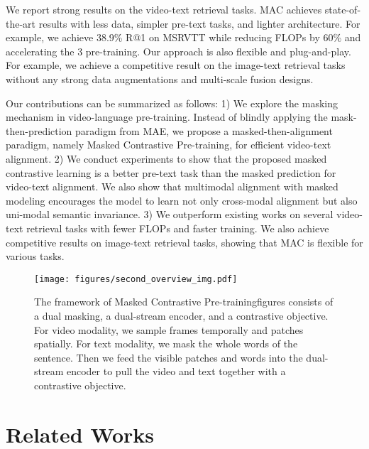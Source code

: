 \documentclass[10pt,twocolumn,letterpaper]{article}
\begin{document}
We report strong results on the video-text retrieval tasks. MAC achieves state-of-the-art results with less data, simpler pre-text tasks, and lighter architecture. For example, we achieve 38.9\% R@1 on MSRVTT while reducing FLOPs by 60\% and accelerating the 3  pre-training. Our approach is also flexible and plug-and-play. For example, we achieve a competitive result on the image-text retrieval tasks without any strong data augmentations and multi-scale fusion designs. 

Our contributions can be summarized as follows: 1) We explore the masking mechanism in video-language pre-training. Instead of blindly applying the mask-then-prediction paradigm from MAE, we propose a masked-then-alignment paradigm, namely Masked Contrastive Pre-training, for efficient video-text alignment. 
2) We conduct experiments to show that the proposed masked contrastive learning is a better pre-text task than the masked prediction for video-text alignment. We also show that multimodal alignment with masked modeling encourages the model to learn not only cross-modal alignment but also uni-modal semantic invariance.
3) We outperform existing works on several video-text retrieval tasks with fewer FLOPs and faster training. We also achieve competitive results on image-text retrieval tasks, showing that MAC is flexible for various tasks.

\begin{figure*}[t]
\centering
\texttt{[image: figures/second\_overview\_img.pdf]}
\vspace{-2mm}
\caption{The framework of Masked Contrastive Pre-trainingfigures consists of a dual masking, a dual-stream encoder, and a contrastive objective. For video modality, we sample frames temporally and patches spatially. For text modality, we mask the whole words of the sentence. Then we feed the visible patches and words into the dual-stream encoder to pull the video and text together with a contrastive objective. }
\vspace{-2mm}
\label{fig:current_method}
\end{figure*}


  
\vspace{-1mm}\section{Related Works}
\label{sec:related works}
\end{document}
